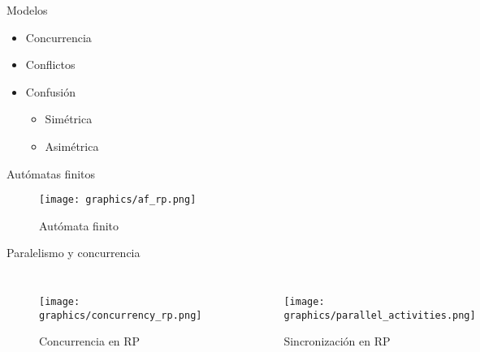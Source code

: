 \documentclass[
compress,
xcolor=table,
dvipsnames,
]{beamer}
\begin{document}
\begin{frame}{Modelos}
    \begin{itemize}
        \item Concurrencia
        \item Conflictos
        \item Confusión
            \begin{itemize}
                \item Simétrica
                \item Asimétrica
            \end{itemize}
    \end{itemize}
\end{frame}


\begin{frame}{Autómatas finitos}
    \begin{figure}[h]
        \texttt{[image: graphics/af\_rp.png]}
        \caption{Autómata finito \citep{Murata:89}}
    \end{figure}
\end{frame}


\begin{frame}{Paralelismo y concurrencia}
  \begin{columns}
    \begin{figure}[h]
        \texttt{[image: graphics/concurrency\_rp.png]}
        \caption{Concurrencia en RP \citep{Murata:89}}
    \end{figure}
        \begin{figure}[h]
            \texttt{[image: graphics/parallel\_activities.png]}
            \caption{Sincronización en RP \citep{Murata:89}}
        \end{figure}
  \end{columns}
\end{frame}
\end{document}
